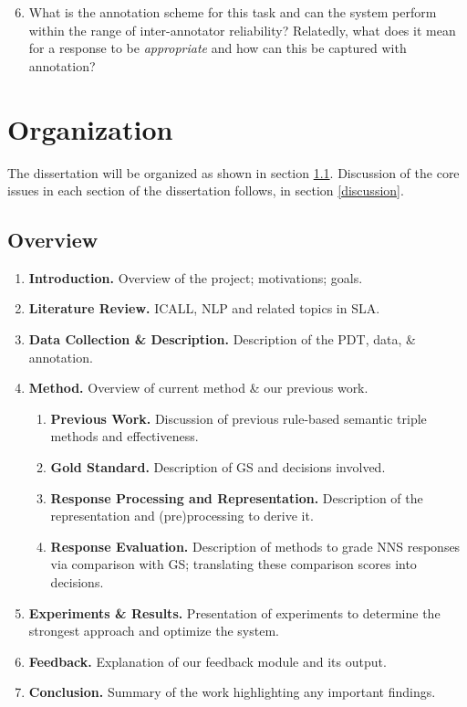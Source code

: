 \begin{enumerate}\setcounter{enumi}{5}
\item{What is the annotation scheme for this task and can the system perform within the range of inter-annotator reliability? Relatedly, what does it mean for a response to be \textit{appropriate} and how can this be captured with annotation?}
\end{enumerate}

\section{Organization}
The dissertation will be organized as shown in section \ref{overview}. Discussion of the core issues in each section of the dissertation follows, in section \ref{discussion}.

\subsection{Overview}
\label{overview}
\begin{enumerate}
\item{\textbf{Introduction.} Overview of the project; motivations; goals.}
\item{\textbf{Literature Review.} ICALL, NLP and related topics in SLA.}
\item{\textbf{Data Collection \& Description.} Description of the PDT, data, \& annotation.}
\item{\textbf{Method.} Overview of current method \& our previous work. 
\begin{enumerate}
\item{\textbf{Previous Work.} Discussion of previous rule-based semantic triple methods and effectiveness.}
\item{\textbf{Gold Standard.} Description of GS and decisions involved.}
\item{\textbf{Response Processing and Representation.} Description of the representation and (pre)processing to derive it.} 
\item{\textbf{Response Evaluation.} Description of methods to grade NNS responses via comparison with GS; translating these comparison scores into decisions.} 
\end{enumerate}}
\item{\textbf{Experiments \& Results.}} Presentation of experiments to determine the strongest approach and optimize the system.
\item{\textbf{Feedback.} Explanation of our feedback module and its output.}
\item{\textbf{Conclusion.} Summary of the work highlighting any important findings.}
\end{enumerate}
